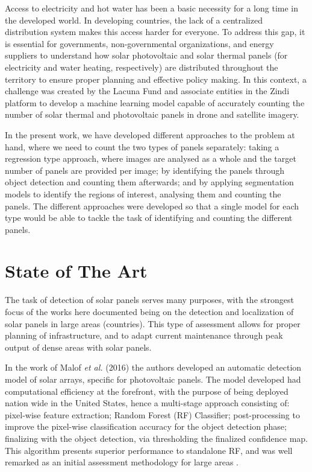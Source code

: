 \documentclass[conference]{IEEEtran}
\begin{document}
Access to electricity and hot water has been a basic necessity for a long time in the developed world. In developing countries, the lack of a centralized distribution system makes this access harder for everyone. To address this gap, it is essential for governments, non-governmental organizations, and energy suppliers to understand how solar photovoltaic and solar thermal panels (for electricity and water heating, respectively) are distributed throughout the territory to ensure proper planning and effective policy making. In this context, a challenge was created by the Lacuna Fund and associate entities in the Zindi platform to develop a machine learning model capable of accurately counting the number of solar thermal and photovoltaic panels in drone and satellite imagery.

In the present work, we have developed different approaches to the problem at hand, where we need to count the two types of panels separately: taking a regression type approach, where images are analysed as a whole and the target number of panels are provided per image; by identifying the panels through object detection and counting them afterwards; and by applying segmentation models to identify the regions of interest, analysing them and counting the panels. The different approaches were developed so that a single model for each type would be able to tackle the task of identifying and counting the different panels.

\section{State of The Art}

The task of detection of solar panels serves many purposes, with the strongest focus of the works here documented being on the detection and localization of solar panels in large areas (countries). This type of assessment allows for proper planning of infrastructure, and to adapt current maintenance through peak output of dense areas with solar panels.

In the work of Malof \textit{et al.} (2016) the authors developed an automatic detection model of solar arrays, specific for photovoltaic panels. The model developed had computational efficiency at the forefront, with the purpose of being deployed nation wide in the United States, hence a multi-stage approach consisting of: pixel-wise feature extraction; Random Forest (RF) Classifier; post-processing to improve the pixel-wise classification accuracy for the object detection phase; finalizing with the object detection, via thresholding the finalized confidence map. This algorithm presents superior performance to standalone RF, and was well remarked as an initial assessment methodology for large areas \cite{Malof_2016}. 
\end{document}
